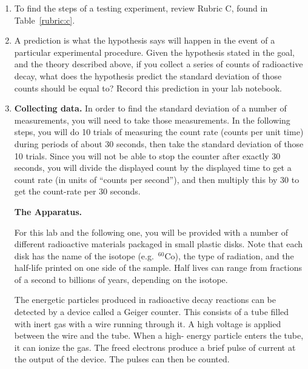 \begin{enumerate}
	\item To find the steps of a testing experiment, review Rubric C, found in Table~\ref{rubric:c}.
	
	\item\label{rad1:step:predict-random} A prediction is what the hypothesis says will happen in the event of a particular experimental procedure. Given the hypothesis stated in the goal, and the theory described above, if you collect a series of counts of radioactive decay, what does the hypothesis predict the standard deviation of those counts should be equal to? Record this prediction in your lab notebook.
	
	\item \textbf{Collecting data.} In order to find the standard deviation of a number of measurements, you will need to take those measurements. In the following steps, you will do 10 trials of measuring the count rate (counts per unit time) during periods of about 30 seconds, then take the standard deviation of those 10 trials. Since you will not be able to stop the counter after exactly 30 seconds, you will divide the displayed count by the displayed time to get a count rate (in units of ``counts per second''), and then multiply this by 30 to get the count-rate per 30 seconds.
	
	\begin{framed}
		\textbf{The Apparatus.}
		
		For this lab and the following one, you will be provided with a number of different radioactive materials packaged in small plastic disks. Note that each disk has the name of
		the isotope (e.g.\ $^{60}$Co), the type of radiation, and the half-life printed on one side of the
		sample. Half lives can range from fractions of a second to billions of years, depending on
		the isotope.
		
		The energetic particles produced in radioactive decay reactions can be detected by a
		device called a Geiger counter. This consists of a tube filled with inert gas with a wire
		running through it. A high voltage is applied between the wire and the tube. When a high-
		energy particle enters the tube, it can ionize the gas. The freed electrons produce a brief
		pulse of current at the output of the device. The pulses can then be counted.
		

\end{framed}
\end{enumerate}

